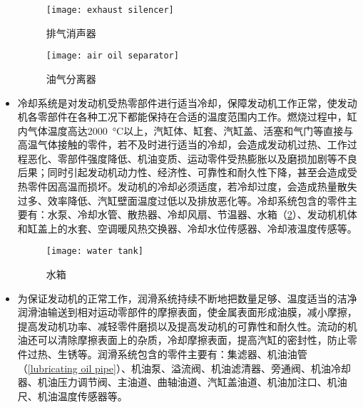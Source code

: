 \documentclass[UTF8]{ctexart}
\numberwithin{figure}{section}
\numberwithin{table}{section}
\begin{document}
\begin{itemize}
	      \begin{figure}[htbp]
		      \centering
		      \begin{minipage}[b]{0.3\textwidth}
			      \centering
			      \texttt{[image: exhaust silencer]}
			      \caption{排气消声器}
			      \label{exhaust silencer}
		      \end{minipage}
		      \begin{minipage}[b]{0.5\textwidth}
			      \centering
			      \texttt{[image: air oil separator]}
			      \caption{油气分离器}
			      \label{air oil separator}
		      \end{minipage}
	      \end{figure}

	\item 冷却系统是对发动机受热零部件进行适当冷却，保障发动机工作正常，使发动机各零部件在各种工况下都能保持在合适的温度范围内工作。燃烧过程中，缸内气体温度高达\SI{2000}{\celsius}以上，汽缸体、缸套、汽缸盖、活塞和气门等直接与高温气体接触的零件，若不及时进行适当的冷却，会造成发动机过热、工作过程恶化、零部件强度降低、机油变质、运动零件受热膨胀以及磨损加剧等不良后果；同时引起发动机动力性、经济性、可靠性和耐久性下降，甚至会造成受热零件因高温而损坏。发动机的冷却必须适度，若冷却过度，会造成热量散失过多、效率降低、汽缸壁面温度过低以及排放恶化等。冷却系统包含的零件主要有：水泵、冷却水管、散热器、冷却风扇、节温器、水箱（\cref{water tank}）、发动机机体和缸盖上的水套、空调暖风热交换器、冷却水位传感器、冷却液温度传感等。

	      \begin{figure}[htbp]
		      \centering
		      \begin{minipage}[b]{0.5\textwidth}
			      \centering
			      \texttt{[image: water tank]}
			      \caption{水箱}
			      \label{water tank}
		      \end{minipage}
	      \end{figure}

	\item 为保证发动机的正常工作，润滑系统持续不断地把数量足够、温度适当的洁净润滑油输送到相对运动零部件的摩擦表面，使金属表面形成油膜，减小摩擦，提高发动机功率、减轻零件磨损以及提高发动机的可靠性和耐久性。流动的机油还可以清除摩擦表面上的杂质，冷却摩擦表面，提高汽缸的密封性，防止零件过热、生锈等。润滑系统包含的零件主要有：集滤器、机油油管（\cref{lubricating oil pipe}）、机油泵、溢流阀、机油滤清器、旁通阀、机油冷却器、机油压力调节阀、主油道、曲轴油道、汽缸盖油道、机油加注口、机油尺、机油温度传感器等。


\end{itemize}
\end{document}
